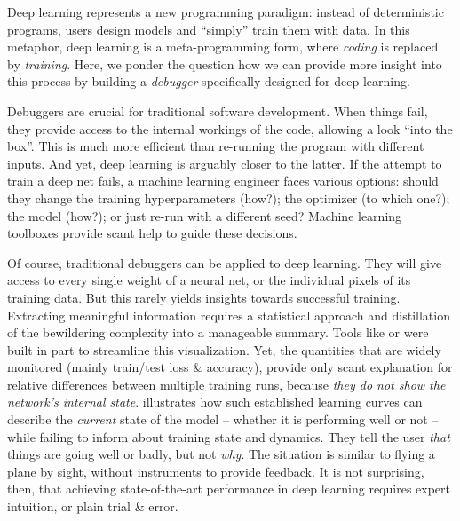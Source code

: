 Deep learning represents a new programming paradigm: instead of deterministic
programs, users design models and ``simply'' train them with data. In this
metaphor, deep learning is a meta-programming form, where \emph{coding} is
replaced by \emph{training}. Here, we ponder the question how we can provide
more insight into this process by building a \emph{debugger} specifically
designed for deep learning.

Debuggers are crucial for traditional software development. When things fail,
they provide access to the internal workings of the code, allowing a look ``into
the box''. This is much more efficient than re-running the program with
different inputs. And yet, deep learning is arguably closer to the latter. If
the attempt to train a deep net fails, a machine learning engineer faces various
options: should they change the training hyperparameters (how?); the optimizer
(to which one?); the model (how?); or just re-run with a different seed? Machine
learning toolboxes provide scant help to guide these decisions.

Of course, traditional debuggers can be applied to deep learning. They will give
access to every single weight of a neural net, or the individual pixels of its
training data. But this rarely yields insights towards successful training.
Extracting meaningful information requires a statistical approach and
distillation of the bewildering complexity into a manageable summary. Tools like
\tensorboard \citep{abadi2016tensorflow} or \wandb \citep{biewald2020experiment} were built in part
to streamline this visualization. Yet, the quantities that are widely monitored
(mainly train/test loss \& accuracy), provide only scant explanation for
relative differences between multiple training runs, because \emph{they do not
  show the network's internal state}.  illustrates how such
established learning curves can describe the \emph{current} state of the model
-- whether it is performing well or not -- while failing to inform about
training state and dynamics. They tell the user \emph{that} things are going
well or badly, but not \emph{why}. The situation is similar to flying a plane by
sight, without instruments to provide feedback. It is not surprising, then, that
achieving state-of-the-art performance in deep learning requires expert
intuition, or plain trial \& error.

